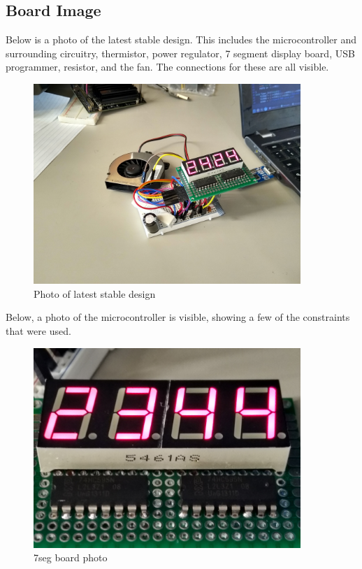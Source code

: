 \documentclass{hitec}
\begin{document}
\subsection{Board Image}
Below is a photo of the latest stable design. This includes the microcontroller and surrounding circuitry, thermistor, power regulator, 7 segment display board, USB programmer, resistor, and the fan. The connections for these are all visible.
\begin{figure}[H]
\centering
\includegraphics[width=0.9\textwidth]{boardphoto.jpg}
\caption{Photo of latest stable design}
\label{fig:programmerbreadboard}
\end{figure}
Below, a photo of the microcontroller is visible, showing a few of the constraints that were used. 
\begin{figure}[H]
\centering
\includegraphics[width=0.9\textwidth]{boardphoto2.jpg}
\caption{7seg board photo}
\label{fig:boardphoto}
\end{figure}
\end{document}
